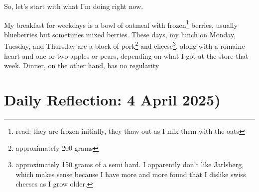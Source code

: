 \documentclass[12pt]{article}[titlepage]
\renewcommand{\,}{\textsuperscript{,}}
\begin{document}
So, let's start with what I'm doing right now.

My breakfast for weekdays is a bowl of oatmeal with frozen\footnote{read: they are frozen initially, they thaw out as I mix them with the oats} berries, usually blueberries but sometimes mixed berries.  
These days, my lunch on Monday, Tuesday, and Thursday are a block of pork\footnote{approximately 200 grams} and cheese\footnote{approximately 150 grams of a semi hard. I apparently don't like Jarlsberg, which makes sense because I have more and more found that I dislike swiss cheeses as I grow older.}, along with a romaine heart and one or two apples or pears, depending on what I got at the store that week.  
Dinner, on the other hand, has no regularity  
\section{Daily Reflection: 4 April 2025)}
\end{document}
